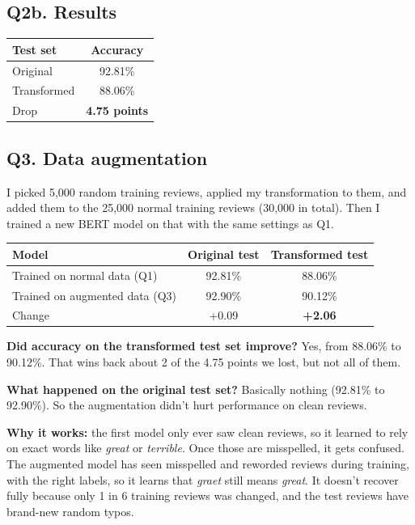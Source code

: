 \documentclass[11pt]{article}
\begin{document}
\subsection*{Q2b. Results}

\begin{center}
\begin{tabular}{|l|c|}
\hline
Test set & Accuracy \\ \hline
Original & 92.81\% \\
Transformed & 88.06\% \\ \hline
Drop & \textbf{4.75 points} \\ \hline
\end{tabular}
\end{center}

\subsection*{Q3. Data augmentation}

I picked 5,000 random training reviews, applied my transformation to them, and added them to the
25,000 normal training reviews (30,000 in total). Then I trained a new BERT model on that with the
same settings as Q1.

\begin{center}
\begin{tabular}{|l|c|c|}
\hline
Model & Original test & Transformed test \\ \hline
Trained on normal data (Q1) & 92.81\% & 88.06\% \\
Trained on augmented data (Q3) & 92.90\% & 90.12\% \\ \hline
Change & +0.09 & \textbf{+2.06} \\ \hline
\end{tabular}
\end{center}

\textbf{Did accuracy on the transformed test set improve?} Yes, from 88.06\% to 90.12\%. That wins
back about 2 of the 4.75 points we lost, but not all of them.

\textbf{What happened on the original test set?} Basically nothing (92.81\% to 92.90\%). So the
augmentation didn't hurt performance on clean reviews.

\textbf{Why it works:} the first model only ever saw clean reviews, so it learned to rely on exact
words like \emph{great} or \emph{terrible}. Once those are misspelled, it gets confused. The
augmented model has seen misspelled and reworded reviews during training, with the right labels,
so it learns that \emph{graet} still means \emph{great}. It doesn't recover fully because only 1
in 6 training reviews was changed, and the test reviews have brand-new random typos.
\end{document}
